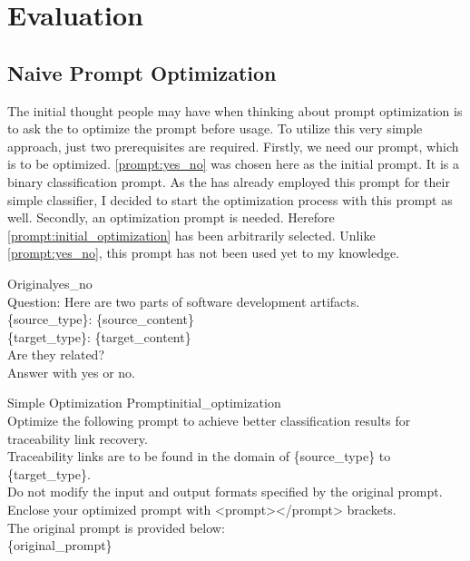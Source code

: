 
\chapter{Evaluation}
\label{ch:Evaluation}


\section{Naive Prompt Optimization}
\label{sec:Evaluation:FirstSection}

The initial thought people may have when thinking about prompt optimization is to ask the \LLM to optimize the prompt before usage. To utilize this very simple approach, just two prerequisites are required. Firstly, we need our prompt, which is to be optimized. \autoref{prompt:yes_no} was chosen here as the initial prompt. It is a \KISS binary classification prompt. As the \LiSSAf has already employed this prompt for their simple classifier, I decided to start the optimization process with this prompt as well. Secondly, an optimization prompt is needed. Herefore \autoref{prompt:initial_optimization} has been arbitrarily selected. Unlike \autoref{prompt:yes_no}, this prompt has not been used yet to my knowledge. %

\begin{prompt}{\KISS Original}{yes_no}\\
    Question: Here are two parts of software development artifacts.\\
    \{source\_type\}: \tripplequote \{source\_content\}\tripplequote\\
    \{target\_type\}: \tripplequote\{target\_content\}\tripplequote\\
    Are they related?\\
    Answer with \textquotesingle{}yes\textquotesingle{} or \textquotesingle{}no\textquotesingle{}.
\end{prompt}

\begin{prompt}{Simple Optimization Prompt}{initial_optimization}\\
    Optimize the following prompt to achieve better classification results for traceability link recovery. \\
    Traceability links are to be found in the domain of \{source\_type\} to \{target\_type\}. \\
    Do not modify the input and output formats specified by the original prompt.\\
    Enclose your optimized prompt with <prompt></prompt> brackets.\\
    The original prompt is provided below:\\
    \tripplequote\{original\_prompt\}\tripplequote
\end{prompt}

